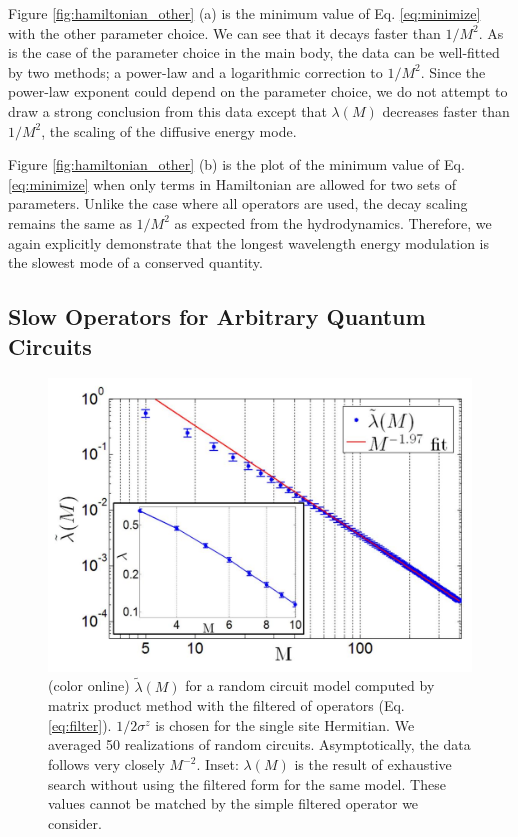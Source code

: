 \documentclass[twocolumn,superscriptaddress, prl,showpacs]{revtex4-1}
\begin{document}
Figure \ref{fig:hamiltonian_other} (a) is the minimum value of Eq. \eqref{eq:minimize} with the other parameter choice.
We can see that it decays faster than $1/M^2$. As is the case of the parameter choice in the main body,
the data can be well-fitted by two methods; a power-law and a logarithmic correction to $1/M^2$.
Since the power-law exponent could depend on the parameter choice, we do not attempt to draw a strong conclusion from this data
except that $\lambda(M)$ decreases faster than $1/M^2$,
the scaling of the diffusive energy mode.

Figure \ref{fig:hamiltonian_other} (b) is the plot of the minimum value of Eq. \eqref{eq:minimize} when only terms in Hamiltonian are allowed
for two sets of parameters. Unlike the case where all operators are used,
the decay scaling remains the same as $1/M^2$ as expected from the hydrodynamics.
Therefore, we again explicitly demonstrate that the longest wavelength energy modulation is the slowest mode of a conserved quantity.


\subsection{Slow Operators for Arbitrary Quantum Circuits}

\begin{figure}
\includegraphics[width=1.0\linewidth]{fig_random_circuit.pdf}
\centering
\caption{ (color online)  $\tilde{\lambda}(M)$ for a random circuit model computed by matrix product method with the filtered of operators (Eq. \eqref{eq:filter}). $1/2\sigma^z$ is chosen for the single site Hermitian. We averaged 50 realizations of random circuits. Asymptotically, the data follows very closely $M^{-2}$.
Inset: $\lambda(M)$ is the result of exhaustive search without using the filtered form for the same model.
These values cannot be matched by the simple filtered operator we consider.}
\label{fig:random_circuit}
\end{figure}
\end{document}
